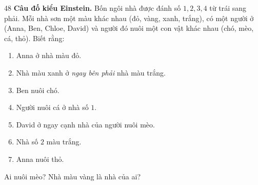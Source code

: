 \begin{probbox}{48}{}
\textbf{Câu đố kiểu Einstein.} Bốn ngôi nhà được đánh số $1, 2, 3, 4$ từ trái sang phải. Mỗi nhà sơn một màu khác nhau (đỏ, vàng,
xanh, trắng), có một người ở (Anna, Ben, Chloe, David) và người đó nuôi một con vật khác nhau (chó, mèo, cá, thỏ). Biết rằng:
\begin{enumerate}[label=(\arabic*),leftmargin=2em,itemsep=0pt,topsep=2pt]
  \item Anna ở nhà màu đỏ.
  \item Nhà màu xanh ở \emph{ngay bên phải} nhà màu trắng.
  \item Ben nuôi chó.
  \item Người nuôi cá ở nhà số $1$.
  \item David ở ngay cạnh nhà của người nuôi mèo.
  \item Nhà số $2$ màu trắng.
  \item Anna nuôi thỏ.
\end{enumerate}
Ai nuôi mèo? Nhà màu vàng là nhà của ai?
\end{probbox}
